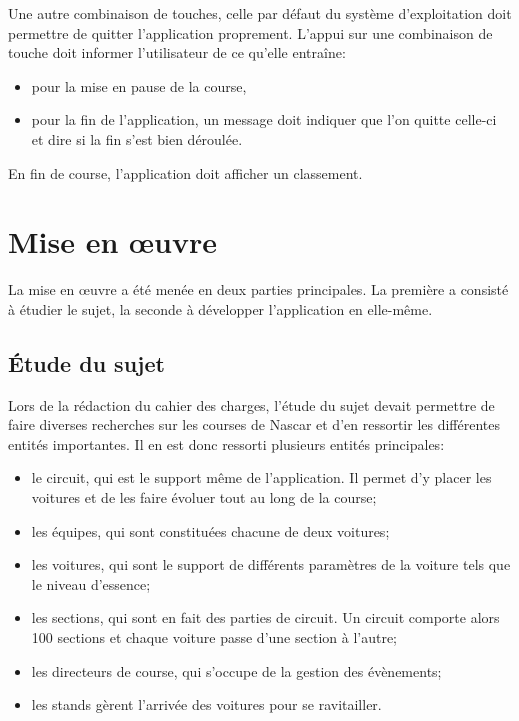 \documentclass[a4paper, 11pt]{report}
\begin{document}
				Une autre combinaison de touches, celle par défaut du système d'exploitation doit permettre de quitter l'application proprement. L'appui sur une combinaison de touche doit informer l'utilisateur de ce qu'elle entraîne:
				\begin{itemize}
					\item pour la mise en pause de la course, 
					\item pour la fin de l'application, un message doit indiquer que l'on quitte celle-ci et dire si la fin s'est bien déroulée.\\
				\end{itemize}
			
			En fin de course, l'application doit afficher un classement.
			
			
	\chapter{Mise en œuvre}
	
		La mise en œuvre a été menée en deux parties principales. La première a consisté à étudier le sujet, la seconde à développer l'application en elle-même. 
		
		\section{Étude du sujet}
		
		Lors de la rédaction du cahier des charges, l'étude du sujet devait permettre de faire diverses recherches sur les courses de Nascar et d'en ressortir les différentes entités importantes. Il en est donc ressorti plusieurs entités principales:
		\begin{itemize}
			\item le circuit, qui est le support même de l'application. Il permet d'y placer les voitures et de les faire évoluer tout au long de la course;
			\item les équipes, qui sont constituées chacune de deux voitures;
			\item les voitures, qui sont le support de différents paramètres de la voiture tels que le niveau d'essence;
			\item les sections, qui sont en fait des parties de circuit. Un circuit comporte alors 100 sections et chaque voiture passe d'une section à l'autre;
			\item les directeurs de course, qui s'occupe de la gestion des évènements;
			\item les stands gèrent l'arrivée des voitures pour se ravitailler.\\
		\end{itemize}
		
\end{document}

